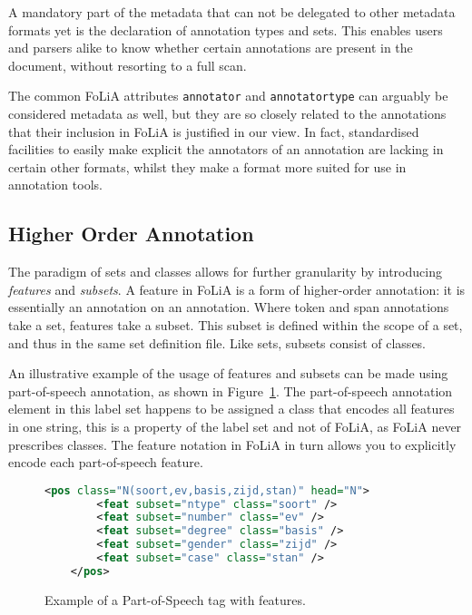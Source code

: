 \documentclass[a4paper,10pt,twoside]{article}
\begin{document}
A mandatory part of the metadata that can not be delegated to other metadata
formats yet is the declaration of annotation types and sets. This enables users
and parsers alike to know whether certain annotations are present in the
document, without resorting to a full scan. 

The common FoLiA attributes \texttt{annotator} and
\texttt{annotatortype} can arguably be considered metadata as well, but they are so closely
related to the annotations that their inclusion in FoLiA is justified in our view. In
fact, standardised facilities to easily make explicit the annotators of an
annotation are lacking in certain other formats, whilst they make a format more
suited for use in annotation tools.



\subsection{Higher Order Annotation}
\label{sec:higherorder}
\label{sec:features}

The paradigm of sets and classes allows for further granularity by introducing
\emph{features} and \emph{subsets}. A feature in FoLiA is a form of
higher-order annotation: it is essentially an annotation on an annotation.
Where token and span annotations take a set, features take a subset. This
subset is defined within the scope of a set, and thus in the same set
definition file. Like sets, subsets consist of classes.

An illustrative example of the usage of features and subsets can be made using
part-of-speech annotation, as shown in Figure~\ref{fig:features}. The
part-of-speech annotation element in this label set happens to be assigned a
class that encodes all features in one string, this is a property of the label
set and not of FoLiA, as FoLiA never prescribes classes. The feature notation
in FoLiA in turn allows you to explicitly encode each part-of-speech feature. 


\begin{figure}[tbh]
\begin{lstlisting}[language=xml]
    <pos class="N(soort,ev,basis,zijd,stan)" head="N">
        <feat subset="ntype" class="soort" />
        <feat subset="number" class="ev" />
        <feat subset="degree" class="basis" />
        <feat subset="gender" class="zijd" />
        <feat subset="case" class="stan" />
    </pos>
\end{lstlisting}
\caption{Example of a Part-of-Speech tag with features.\label{fig:features}}
\end{figure}
\end{document}

